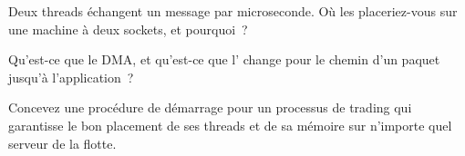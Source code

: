 \begin{interviewq}\label{iq:ll:multi-socket-machines-and-interconnects:4}
Deux threads échangent un message par microseconde. Où les placeriez-vous sur une machine à deux sockets, et pourquoi~?
\end{interviewq}

\begin{interviewq}\label{iq:ll:multi-socket-machines-and-interconnects:5}
Qu'est-ce que le DMA, et qu'est-ce que l' change pour le chemin d'un paquet jusqu'à l'application~?
\end{interviewq}

\begin{interviewq}\label{iq:ll:multi-socket-machines-and-interconnects:6}
Concevez une procédure de démarrage pour un processus de trading qui garantisse le bon placement de ses threads et de sa mémoire sur
n'importe quel serveur de la flotte.
\end{interviewq}

